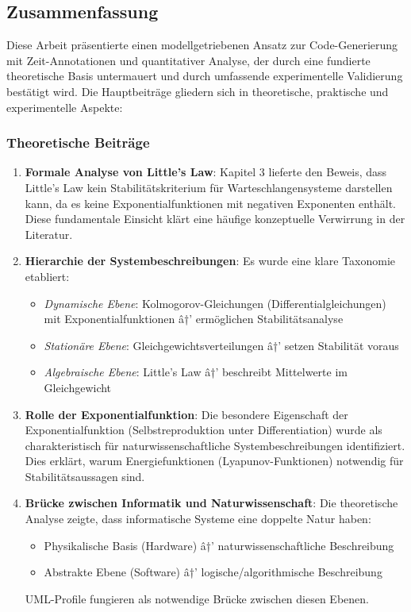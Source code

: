 ﻿\documentclass[a4paper,12pt]{scrreprt}
\theoremstyle{definition}
\begin{document}
\subsection{Zusammenfassung}

Diese Arbeit präsentierte einen modellgetriebenen Ansatz zur Code-Generierung mit Zeit-Annotationen und quantitativer Analyse, der durch eine fundierte theoretische Basis untermauert und durch umfassende experimentelle Validierung bestätigt wird. Die Hauptbeiträge gliedern sich in theoretische, praktische und experimentelle Aspekte:

\subsubsection{Theoretische Beiträge}

\begin{enumerate}
	\item[-] \textbf{Formale Analyse von Little's Law}: Kapitel 3 lieferte den Beweis, dass Little's Law kein Stabilitätskriterium für Warteschlangensysteme darstellen kann, da es keine Exponentialfunktionen mit negativen Exponenten enthält. Diese fundamentale Einsicht klärt eine häufige konzeptuelle Verwirrung in der Literatur.
	
	\item[-] \textbf{Hierarchie der Systembeschreibungen}: Es wurde eine klare Taxonomie etabliert:
	\begin{itemize}
		\item[-] \textit{Dynamische Ebene}: Kolmogorov-Gleichungen (Differentialgleichungen) mit Exponentialfunktionen â†’ ermöglichen Stabilitätsanalyse
		\item[-] \textit{Stationäre Ebene}: Gleichgewichtsverteilungen â†’ setzen Stabilität voraus
		\item[-] \textit{Algebraische Ebene}: Little's Law â†’ beschreibt Mittelwerte im Gleichgewicht
	\end{itemize}
	
	\item[-] \textbf{Rolle der Exponentialfunktion}: Die besondere Eigenschaft der Exponentialfunktion (Selbstreproduktion unter Differentiation) wurde als charakteristisch für naturwissenschaftliche Systembeschreibungen identifiziert. Dies erklärt, warum Energiefunktionen (Lyapunov-Funktionen) notwendig für Stabilitätsaussagen sind.
	
	\item[-] \textbf{Brücke zwischen Informatik und Naturwissenschaft}: Die theoretische Analyse zeigte, dass informatische Systeme eine doppelte Natur haben:
	\begin{itemize}
		\item[-] Physikalische Basis (Hardware) â†’ naturwissenschaftliche Beschreibung
		\item[-] Abstrakte Ebene (Software) â†’ logische/algorithmische Beschreibung
	\end{itemize}
	UML-Profile fungieren als notwendige Brücke zwischen diesen Ebenen.
\end{enumerate}
\end{document}
